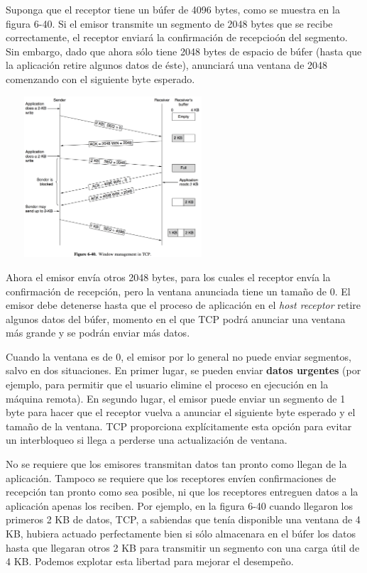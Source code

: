 \documentclass[10pt,a4paper]{report}
\begin{document}
	\par Suponga que el receptor tiene un búfer de 4096 bytes, como se muestra en la figura 6-40. Si el emisor transmite un segmento de 2048 bytes que se recibe correctamente, el receptor enviará la confirmación de recepcioón del segmento. Sin embargo, dado que ahora sólo tiene 2048 bytes de espacio de búfer (hasta que la aplicación retire algunos datos de éste), anunciará una ventana de 2048 comenzando con el siguiente byte esperado.
	
	\begin{center}
		\includegraphics[width=8cm, height=6cm]{./imagenes/flujotcp.png} 
	\end{center}
	
	\par Ahora el emisor envía otros 2048 bytes, para los cuales el receptor envía la confirmación de recepción, pero la ventana anunciada tiene un tamaño de 0. El emisor debe detenerse hasta que el proceso de aplicación en el \textit{host receptor} retire algunos datos del búfer, momento en el que TCP podrá anunciar una ventana más grande y se podrán enviar más datos.

	\par Cuando la ventana es de 0, el emisor por lo general no puede enviar segmentos, salvo en dos situaciones. En primer lugar, se pueden enviar \textbf{datos urgentes} (por ejemplo, para permitir que el usuario elimine el proceso en ejecución en la máquina remota). En segundo lugar, el emisor puede enviar un segmento de 1 byte para hacer que el receptor vuelva a anunciar el siguiente byte esperado y el tamaño de la ventana. TCP proporciona explícitamente esta opción para evitar un interbloqueo si llega a perderse una actualización de ventana.

	\par No se requiere que los emisores transmitan datos tan pronto como llegan de la aplicación. Tampoco se requiere que los receptores envíen confirmaciones de recepción tan pronto como sea posible, ni que los receptores entreguen datos a la aplicación apenas los reciben. Por ejemplo, en la figura 6-40 cuando llegaron los primeros 2 KB de datos, TCP, a sabiendas que tenía disponible una ventana de 4 KB, hubiera actuado perfectamente bien si sólo almacenara en el búfer los datos hasta que llegaran otros 2 KB para transmitir un segmento con una carga útil de 4 KB. Podemos explotar esta libertad para mejorar el desempeño.
	
\end{document}
